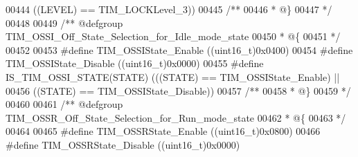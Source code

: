 \begin{DoxyCode}
00444                                   \textcolor{preprocessor}{(}\textcolor{preprocessor}{(}\textcolor{preprocessor}{LEVEL}\textcolor{preprocessor}{)} \textcolor{preprocessor}{==} TIM_LOCKLevel_3\textcolor{preprocessor}{)}\textcolor{preprocessor}{)}
00445 \textcolor{comment}{/**}
00446 \textcolor{comment}{  * @\}}
00447 \textcolor{comment}{  */}
00448 
00449 \textcolor{comment}{/** @defgroup TIM\_OSSI\_Off\_State\_Selection\_for\_Idle\_mode\_state }
00450 \textcolor{comment}{  * @\{}
00451 \textcolor{comment}{  */}
00452 
00453 \textcolor{preprocessor}{#}\textcolor{preprocessor}{define} \textcolor{preprocessor}{TIM\_OSSIState\_Enable}               \textcolor{preprocessor}{(}\textcolor{preprocessor}{(}\textcolor{preprocessor}{uint16\_t}\textcolor{preprocessor}{)}0x0400\textcolor{preprocessor}{)}
00454 \textcolor{preprocessor}{#}\textcolor{preprocessor}{define} \textcolor{preprocessor}{TIM\_OSSIState\_Disable}              \textcolor{preprocessor}{(}\textcolor{preprocessor}{(}\textcolor{preprocessor}{uint16\_t}\textcolor{preprocessor}{)}0x0000\textcolor{preprocessor}{)}
00455 \textcolor{preprocessor}{#}\textcolor{preprocessor}{define} \textcolor{preprocessor}{IS\_TIM\_OSSI\_STATE}\textcolor{preprocessor}{(}\textcolor{preprocessor}{STATE}\textcolor{preprocessor}{)} \textcolor{preprocessor}{(}\textcolor{preprocessor}{(}\textcolor{preprocessor}{(}\textcolor{preprocessor}{STATE}\textcolor{preprocessor}{)} \textcolor{preprocessor}{==} TIM_OSSIState_Enable\textcolor{preprocessor}{)} \textcolor{preprocessor}{||}
00456                                   \textcolor{preprocessor}{(}\textcolor{preprocessor}{(}\textcolor{preprocessor}{STATE}\textcolor{preprocessor}{)} \textcolor{preprocessor}{==} TIM_OSSIState_Disable\textcolor{preprocessor}{)}\textcolor{preprocessor}{)}
00457 \textcolor{comment}{/**}
00458 \textcolor{comment}{  * @\}}
00459 \textcolor{comment}{  */}
00460 
00461 \textcolor{comment}{/** @defgroup TIM\_OSSR\_Off\_State\_Selection\_for\_Run\_mode\_state}
00462 \textcolor{comment}{  * @\{}
00463 \textcolor{comment}{  */}
00464 
00465 \textcolor{preprocessor}{#}\textcolor{preprocessor}{define} \textcolor{preprocessor}{TIM\_OSSRState\_Enable}               \textcolor{preprocessor}{(}\textcolor{preprocessor}{(}\textcolor{preprocessor}{uint16\_t}\textcolor{preprocessor}{)}0x0800\textcolor{preprocessor}{)}
00466 \textcolor{preprocessor}{#}\textcolor{preprocessor}{define} \textcolor{preprocessor}{TIM\_OSSRState\_Disable}              \textcolor{preprocessor}{(}\textcolor{preprocessor}{(}\textcolor{preprocessor}{uint16\_t}\textcolor{preprocessor}{)}0x0000\textcolor{preprocessor}{)}

\end{DoxyCode}
